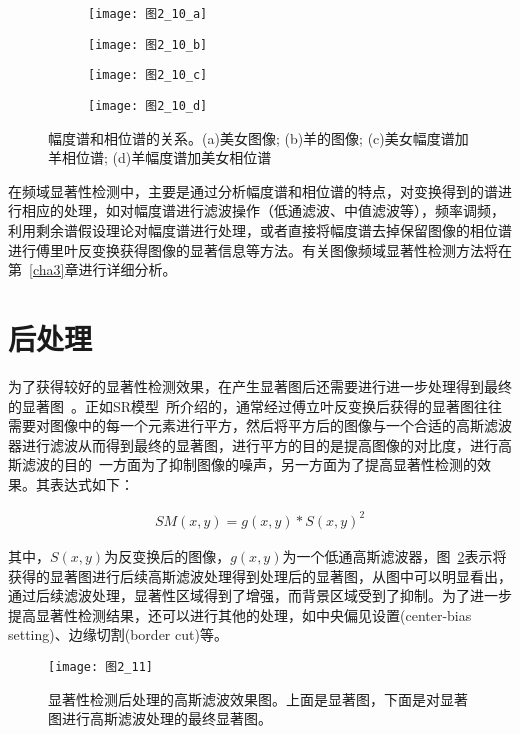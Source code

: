 \begin{figure}[b]
  \centering%
  \begin{subfigure}{0.3\textwidth}
    \texttt{[image: 图2\_10\_a]}
    \caption{}
  \end{subfigure}
  \hspace{4em}%
  \begin{subfigure}{0.3\textwidth}
    \texttt{[image: 图2\_10\_b]}
    \caption{}
  \end{subfigure}
  \hspace{4em}%
  \begin{subfigure}{0.3\textwidth}
    \texttt{[image: 图2\_10\_c]}
    \caption{}
  \end{subfigure}
  \hspace{4em}%
  \begin{subfigure}{0.3\textwidth}
    \texttt{[image: 图2\_10\_d]}
    \caption{}
  \end{subfigure}
  \caption{幅度谱和相位谱的关系。(a)美女图像; (b)羊的图像; (c)美女幅度谱加羊相位谱; (d)羊幅度谱加美女相位谱}
  \label{图2_10}
\end{figure}

在频域显著性检测中，主要是通过分析幅度谱和相位谱的特点，对变换得到的谱进行相应的处理，如对幅度谱进行滤波操作（低通滤波、中值滤波等），频率调频，利用剩余谱假设理论对幅度谱进行处理，或者直接将幅度谱去掉保留图像的相位谱进行傅里叶反变换获得图像的显著信息等方法。有关图像频域显著性检测方法将在第~\ref{cha3}章进行详细分析。

\section{后处理}
\label{2_4}

为了获得较好的显著性检测效果，在产生显著图后还需要进行进一步处理得到最终的显著图~\cite{BorjiTIP2013Quantitative}。正如SR模型~\cite{HouXiaodiCVPR2007Residual}所介绍的，通常经过傅立叶反变换后获得的显著图往往需要对图像中的每一个元素进行平方，然后将平方后的图像与一个合适的高斯滤波器进行滤波从而得到最终的显著图，进行平方的目的是提高图像的对比度，进行高斯滤波的目的~\cite{ZhangLiming2010Book}一方面为了抑制图像的噪声，另一方面为了提高显著性检测的效果。其表达式如下：
\begin{linenomath}
\begin{align}
SM(x,y)=g(x,y)\ast S(x,y)^{2}
\label{式2_37}
\end{align}
\end{linenomath}
其中，$S(x,y)$为反变换后的图像，$g(x,y)$为一个低通高斯滤波器，图~\ref{图2_11}表示将获得的显著图进行后续高斯滤波处理得到处理后的显著图，从图中可以明显看出，通过后续滤波处理，显著性区域得到了增强，而背景区域受到了抑制。为了进一步提高显著性检测结果，还可以进行其他的处理，如中央偏见设置(center-bias setting)、边缘切割(border cut)等。
\begin{figure}[h] %
  \centering
  \texttt{[image: 图2\_11]}
  \caption{显著性检测后处理的高斯滤波效果图。上面是显著图，下面是对显著图进行高斯滤波处理的最终显著图。}
  \label{图2_11}
\end{figure}

